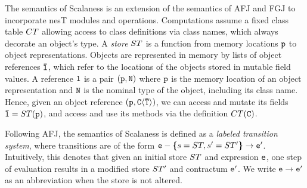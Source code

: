 The semantics of Scalaness is an extension of the semantics of AFJ and
FGJ to incorporate nesT modules and operations.  Computations assume a
fixed class table $\CT$ allowing access to class definitions via class
names, which always decorate an object's type. A \emph{store}
$\jstore$ is a function from memory locations $\tt{p}$ to object
representations.  Objects are represented in memory by lists of object
references $\ttvec{l}$, which refer to the locations of the objects
stored in mutable field values.  A reference $\tt{l}$ is a pair
$\jref{\tt{p}}{N}$ where $\tt{p}$ is the memory location of an object
representation and $\tt{N}$ is the nominal type of the object,
including its class name. Hence, given an object reference
$\jref{\tt{p}}{\jinst{C}{\ttvec{T}}}$, we can access and mutate its
fields $\ttvec{l} = \jstore(\tt{p})$, and access and use its methods
via the definition $\CT(\tt{C})$.

Following AFJ, the semantics of Scalaness is defined as a \emph{labeled
  transition system}, where transitions are of the form
$\tt{e} - \lc s = \jstore, s' = \jstore' \rc \rightarrow \tt{e}'
$. Intuitively, this denotes that given an initial store $\jstore$ and
expression $\tt{e}$, one step of evaluation results in a modified
store $\jstore'$ and contractum $\tt{e}'$. We write $\tt{e}
  \rightarrow \tt{e}'$ as an abbreviation when the store is not altered.

